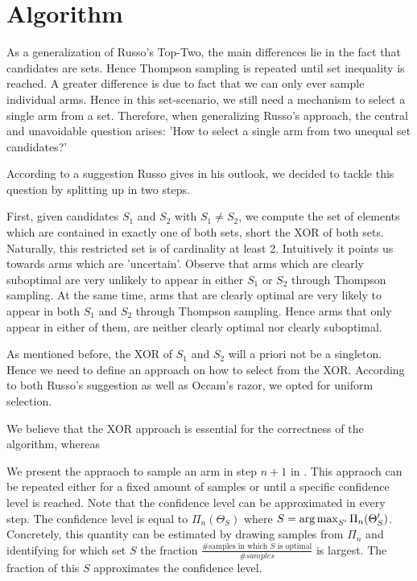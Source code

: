 \section{Algorithm}\label{section:algorithm}
As a generalization of Russo's Top-Two, the main differences lie in the fact that candidates are sets. Hence Thompson sampling is repeated until set inequality is reached. A greater difference is due to fact that we can only ever sample individual arms. Hence in this set-scenario, we still need a mechanism to select a single arm from a set. Therefore, when generalizing Russo's approach, the central and unavoidable question arises: 'How to select a single arm from two unequal set candidates?'

According to a suggestion Russo gives in his outlook, we decided to tackle this question by splitting up in two steps.

First, given candidates $S_1$ and $S_2$ with $S_1 \neq S_2$, we compute the set of elements which are contained in exactly one of both sets, short the XOR of both sets. Naturally, this restricted set is of cardinality at least 2. Intuitively it points us towards arms which are 'uncertain'. Observe that arms which are clearly suboptimal are very unlikely to appear in either $S_1$ or $S_2$ through Thompson sampling. At the same time, arms that are clearly optimal are very likely to appear in both $S_1$ and $S_2$ through Thompson sampling. Hence arms that only appear in either of them, are neither clearly optimal nor clearly suboptimal.

As mentioned before, the XOR of $S_1$ and $S_2$ will a priori not be a singleton. Hence we need to define an approach on how to select from the XOR. According to both Russo's suggestion as well as Occam's razor, we opted for uniform selection.

We believe that the XOR approach is essential for the correctness of the algorithm, whereas

We present the appraoch to sample an arm in step $n + 1$ in . This appraoch can be repeated either for a fixed amount of samples or until a specific confidence level is reached. Note that the confidence level can be approximated in every step. The confidence level is equal to $\Pi_n(\Theta_S)$ where $S = \operatorname*{arg\,max}_{S'} \Pi_n(\Theta_S')$. Concretely, this quantity can be estimated by drawing samples from $\Pi_n$ and identifying for which set $S$ the fraction $\frac{\text{\# samples in which $S$ is optimal}}{\#samples}$ is largest. The fraction of this $S$ approximates the confidence level.

